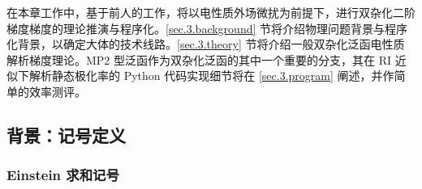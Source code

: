 在本章工作中，基于前人的工作\cite{Gerratt-Mills.JCP.1968, Gerratt-Mills.JCP.1968a, Pople-Binkley.IJQC.1979, Dykstra-Jasien.CPL.1984, Handy-Schaefer.JCP.1984, Handy-Simandiras.CPL.1985, Pulay-Saeboe.TCA.1986, Trucks-Bartlett.CPL.1988, Frisch-Pople.CP.1990, Frisch-Pople.CPL.1990, Frisch-Pople.CPL.1990a, Gauss-Bartlett.JCP.1992, Stanton-Bartlett.CPL.1992, Johnson-Frisch.CPL.1993, Head-Gordon-Head-Gordon.CPL.1994, Yamaguchi-Schaefer.Oxford.1994, Weigend-Haeser.TCA.1997, Aikens-Gordon.TCA.2003, Cammi-Frisch.TCA.2004, Distasio-Head-Gordon.JCC.2007, Neese-Grimme.JCP.2007, Biczysko-Barone.JCTC.2010, Su-Xu.JCC.2013, Ji-Jung.JCTC.2013, Bykov-Neese.MP.2015, Stoychev-Neese.JCTC.2018, Gu-Xu.JCTC.2021, Yan-Xu.JCTC.2022}，将以电性质外场微扰为前提下，进行双杂化二阶梯度梯度的理论推演与程序化。\ref{sec.3.background} 节将介绍物理问题背景与程序化背景，以确定大体的技术线路。\ref{sec.3.theory} 节将介绍一般双杂化泛函电性质解析梯度理论。MP2 型泛函作为双杂化泛函的其中一个重要的分支，其在 RI 近似下解析静态极化率的 Python 代码实现细节将在 \ref{sec.3.program} 阐述，并作简单的效率测评。

\subsection{背景：记号定义}

\subsubsection{Einstein 求和记号}


